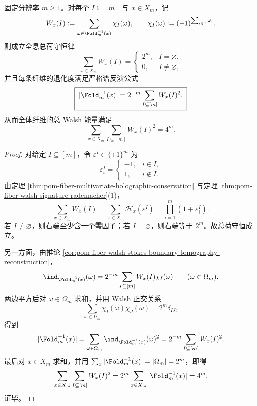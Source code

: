 \begin{theorem}\label{thm:conclusion-fold-walsh-total-charge-parseval-degeneracy}
固定分辨率 \(m\ge 1\)。对每个 \(I\subseteq[m]\) 与 \(x\in X_m\)，记
\[
W_x(I):=\sum_{\omega\in \Fold_m^{-1}(x)}\chi_I(\omega),
\qquad
\chi_I(\omega):=(-1)^{\sum_{i\in I}\omega_i}.
\]
则成立全息总荷守恒律
\[
\sum_{x\in X_m}W_x(I)=
\begin{cases}
2^m,& I=\varnothing,\\[1ex]
0,& I\neq \varnothing,
\end{cases}
\]
并且每条纤维的退化度满足严格谱反演公式
\[
\boxed{\;
|\Fold_m^{-1}(x)|=2^{-m}\sum_{I\subseteq[m]}W_x(I)^2.\;}
\]
从而全体纤维的总 Walsh 能量满足
\[
\sum_{x\in X_m}\sum_{I\subseteq[m]}W_x(I)^2=4^m.
\]
\end{theorem}
\begin{proof}
对给定 \(I\subseteq[m]\)，令 \(\varepsilon^I\in\{\pm 1\}^m\) 为
\[
\varepsilon_i^I=
\begin{cases}
-1,& i\in I,\\
1,& i\notin I.
\end{cases}
\]
由定理 \ref{thm:pom-fiber-multivariate-holographic-conservation} 与定理 \ref{thm:pom-fiber-walsh-signature-rademacher}(1)，
\[
\sum_{x\in X_m}W_x(I)
=\sum_{x\in X_m}\mathcal H_x(\varepsilon^I)
=\prod_{i=1}^{m}(1+\varepsilon_i^I).
\]
若 \(I\neq\varnothing\)，则右端至少含一个零因子；若 \(I=\varnothing\)，则右端等于 \(2^m\)。故总荷守恒成立。

另一方面，由推论 \ref{cor:pom-fiber-walsh-stokes-boundary-tomography-reconstruction}，
\[
\ind_{\Fold_m^{-1}(x)}(\omega)
=2^{-m}\sum_{I\subseteq[m]}W_x(I)\chi_I(\omega)
\qquad (\omega\in\Omega_m).
\]
两边平方后对 \(\omega\in\Omega_m\) 求和，并用 Walsh 正交关系
\[
\sum_{\omega\in\Omega_m}\chi_I(\omega)\chi_J(\omega)=2^m\delta_{IJ},
\]
得到
\[
|\Fold_m^{-1}(x)|
=\sum_{\omega\in\Omega_m}\ind_{\Fold_m^{-1}(x)}(\omega)^2
=2^{-m}\sum_{I\subseteq[m]}W_x(I)^2.
\]
最后对 \(x\in X_m\) 求和，并用 \(\sum_x|\Fold_m^{-1}(x)|=|\Omega_m|=2^m\)，即得
\[
\sum_{x\in X_m}\sum_{I\subseteq[m]}W_x(I)^2
=2^m\sum_{x\in X_m}|\Fold_m^{-1}(x)|
=4^m.
\]
证毕。
\end{proof}

